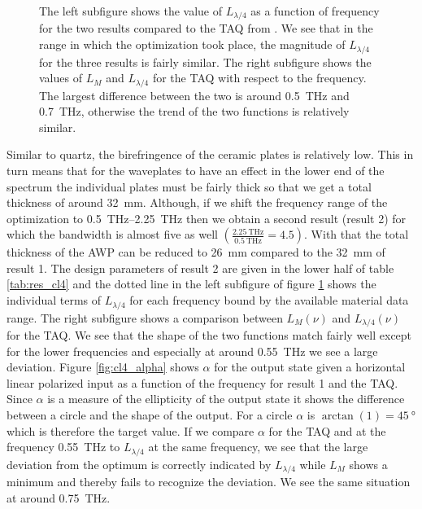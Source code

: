 \begin{figure}[H]
    \centering
    
    \caption{The left subfigure shows the value of $L_{\lambda/4}$ as a function of frequency for the two results compared to the TAQ from \cite{Masson2006}. We see that in the range in which the optimization took place, the magnitude of $L_{\lambda/4}$ for the three results is fairly similar. The right subfigure shows the values of $L_M$ and $L_{\lambda/4}$ for the TAQ with respect to the frequency. The largest difference between the two is around \SI{0.5}{\tera \hertz} and \SI{0.7}{\tera \hertz}, otherwise the trend of the two functions is relatively similar.}
    \label{fig:loss_function_cl4}
\end{figure}

Similar to quartz, the birefringence of the ceramic plates is relatively low. This in turn means that for the waveplates to have an effect in the lower end of the spectrum the individual plates must be fairly thick so that we get a total thickness of around \SI{32}{\milli \meter}. Although, if we shift the frequency range of the optimization to \SIrange[range-phrase=-, range-units=single]{0.5}{2.25}{\tera \hertz} then we obtain a second result (result 2) for which the bandwidth is almost five as well $\left(\frac{\SI{2.25}{\tera \hertz}}{\SI{0.5}{\tera \hertz}}=4.5\right)$. With that the total thickness of the AWP can be reduced to \SI{26}{\milli \meter} compared to the \SI{32}{\milli \meter} of result 1. The design parameters of result 2 are given in the lower half of table \ref{tab:res_cl4} and the dotted line in the left subfigure of figure \ref{fig:loss_function_cl4} shows the individual terms of $L_{\lambda/4}$ for each frequency bound by the available material data range. The right subfigure shows a comparison between $L_M(\nu)$ and $L_{\lambda/4}(\nu)$ for the TAQ. We see that the shape of the two functions match fairly well except for the lower frequencies and especially at around \SI{0.55}{\tera \hertz} we see a large deviation. Figure \ref{fig:cl4_alpha} shows $\alpha$ for the output state given a horizontal linear polarized input as a function of the frequency for result 1 and the TAQ. Since $\alpha$ is a measure of the ellipticity of the output state it shows the difference between a circle and the shape of the output. For a circle $\alpha$ is $\arctan(1)=\SI{45}{\degree}$ which is therefore the target value. If we compare $\alpha$ for the TAQ and at the frequency \SI{0.55}{\tera \hertz} to $L_{\lambda/4}$ at the same frequency, we see that the large deviation from the optimum is correctly indicated by $L_{\lambda/4}$ while $L_M$ shows a minimum and thereby fails to recognize the deviation. We see the same situation at around \SI{0.75}{\tera \hertz}.

